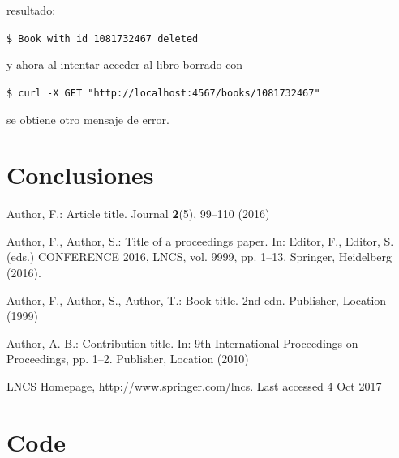 \documentclass[runningheads]{llncs}
\begin{document}
resultado:

\texttt{\$ Book with id 1081732467 deleted}

y ahora al intentar acceder al libro borrado con

\texttt{\$ curl -X GET "http://localhost:4567/books/1081732467"}

se obtiene otro mensaje de error.




\section{Conclusiones}
\label{sc:concl}


\begin{thebibliography}{8}
Author, F.: Article title. Journal \textbf{2}(5), 99--110 (2016)

Author, F., Author, S.: Title of a proceedings paper. In: Editor,
F., Editor, S. (eds.) CONFERENCE 2016, LNCS, vol. 9999, pp. 1--13.
Springer, Heidelberg (2016). 

Author, F., Author, S., Author, T.: Book title. 2nd edn. Publisher,
Location (1999)

Author, A.-B.: Contribution title. In: 9th International Proceedings
on Proceedings, pp. 1--2. Publisher, Location (2010)

LNCS Homepage, \url{http://www.springer.com/lncs}. Last accessed 4
Oct 2017
\end{thebibliography}

\newpage

\appendix
\section{Code}
\label{app:codigo-inicial}
\end{document}
